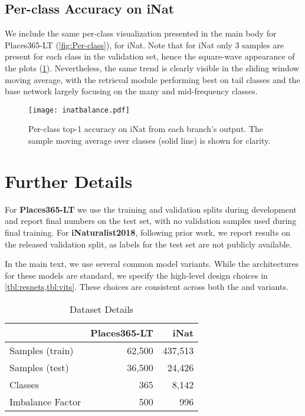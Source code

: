 \documentclass[10pt,twocolumn,letterpaper]{article}
\begin{document}
{\subsection{Per-class Accuracy on iNat}
We include the same per-class visualization presented in the main body for Places365-LT (\cref{fig:Per-class}), for iNat. Note that for iNat only 3 samples are present for each class in the validation set, hence the square-wave appearance of the plots (\cref{fig:inatperclass}). Nevertheless, the same trend is clearly visible in the sliding window moving average, with the retrieval module performing best on tail classes and the base network largely focusing on the many and mid-frequency classes.

\begin{figure}[b]
\centering
\texttt{[image: inatbalance.pdf]}
\caption{Per-class top-1 accuracy on iNat from each branch's output. The  sample moving average over classes (solid line) is shown for clarity.}
\label{fig:inatperclass}
\end{figure}





\section{Further Details}
For \textbf{Places365-LT} we use the training and validation splits during development and report final numbers on the test set, with no validation samples used during final training. For \textbf{iNaturalist2018}, following prior work, we report results on the released validation split, as labels for the test set are not publicly available. 

In the main text, we use several common model variants. While the architectures for these models are standard, we specify the high-level design choices in \cref{tbl:resnets,tbl:vits}. These choices are consistent across both the  and  variants.


\begin{table}[]\label{tbl:dataset}
\centering
\begin{tabular}{@{}lrr@{}}
\toprule
                 & \textbf{Places365-LT} & \textbf{iNat} \\ \midrule
Samples (train)  & 62,500                & 437,513       \\
Samples (test)   & 36,500                & 24,426        \\
Classes          & 365                   & 8,142         \\
Imbalance Factor & 500                   & 996           \\ \bottomrule
\end{tabular}
\caption{Dataset Details}
\end{table}

}
\end{document}
